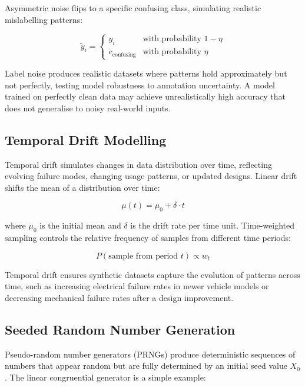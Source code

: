 \documentclass[10pt,a4paper]{article}
\begin{document}
Asymmetric noise flips to a specific confusing class, simulating realistic mislabelling patterns:

\begin{equation}
\tilde{y}_i = \begin{cases} y_i & \text{with probability } 1 - \eta \\ c_{\text{confusing}} & \text{with probability } \eta \end{cases}
\label{eq:asymmetric-noise}
\end{equation}

Label noise produces realistic datasets where patterns hold approximately but not perfectly, testing model robustness to annotation uncertainty. A model trained on perfectly clean data may achieve unrealistically high accuracy that does not generalise to noisy real-world inputs.

\subsection{Temporal Drift Modelling}
\label{sec:temporal-drift}

Temporal drift simulates changes in data distribution over time, reflecting evolving failure modes, changing usage patterns, or updated designs. Linear drift shifts the mean of a distribution over time:

\begin{equation}
\mu(t) = \mu_0 + \delta \cdot t
\label{eq:linear-drift}
\end{equation}

where $\mu_0$ is the initial mean and $\delta$ is the drift rate per time unit. Time-weighted sampling controls the relative frequency of samples from different time periods:

\begin{equation}
P(\text{sample from period } t) \propto w_t
\label{eq:time-weights}
\end{equation}

Temporal drift ensures synthetic datasets capture the evolution of patterns across time, such as increasing electrical failure rates in newer vehicle models or decreasing mechanical failure rates after a design improvement.

\subsection{Seeded Random Number Generation}
\label{sec:seeded-rng}

Pseudo-random number generators (PRNGs) produce deterministic sequences of numbers that appear random but are fully determined by an initial seed value $X_0$. The linear congruential generator is a simple example:
\end{document}
